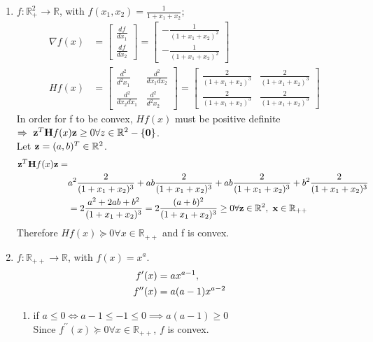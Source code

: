 \documentclass[12pt]{article}
\begin{document}
\begin{enumerate}
\begin{enumerate}
\item 
$f:\mathbb{R}_+^2 \rightarrow \mathbb{R}$, with $f(x_1,x_2) = \frac{1}{1+x_1+x_2}$;
\begin{equation}
	\begin{split}
		\nabla f(x) &=\begin{bmatrix}
			\frac{df}{dx_1} \\ \frac{df}{dx_2}
		\end{bmatrix} =
		\begin{bmatrix}
			-\frac{1}{(1+x_1+x_2)^2} \\ -\frac{1}{(1+x_1+x_2)^2} 
		\end{bmatrix}\\
		Hf(x) &=\begin{bmatrix}
			\frac{d^2}{d^2 x_1} & \frac{d^2}{dx_1dx_2}\\
			\frac{d^2}{dx_2dx_1} & \frac{d^2}{d^2 x_2}
		\end{bmatrix}=\begin{bmatrix}
			\frac{2}{(1+x_1+x_2)^3} & \frac{2}{(1+x_1+x_2)^3}\\
			\frac{2}{(1+x_1+x_2)^3} & \frac{2}{(1+x_1+x_2)^3}
		\end{bmatrix}
	\end{split}
\end{equation}
In order for f to be convex, $Hf(x)$ must be positive definite $\Rightarrow\ {\bf z}^T{\bf H}f(x){\bf z}\ge 0\forall z\in\mathbb{R}^2-\{{\bf 0}\}$.\\
Let ${\bf z}=(a,b)^T \in \mathbb{R}^2$.\\
\begin{equation}
	\begin{split}
		{\bf z}^T{\bf H}f(x){\bf z}= &\\ &a^2\frac{2}{(1+x_1+x_2)^3}+ab\frac{2}{(1+x_1+x_2)^3}+ab\frac{2}{(1+x_1+x_2)^3}+b^2\frac{2}{(1+x_1+x_2)^3} \\
		&=2\frac{a^2+2ab+b^2}{(1+x_1+x_2)^3} = 2\frac{(a+b)^2}{(1+x_1+x_2)^3} \ge0 \forall {\bf z}\in\mathbb{R}^2,\ {\bf x}\in\mathbb{R}_{++}
	\end{split}
\end{equation}
Therefore $Hf(x)\succcurlyeq0 \forall x\in \mathbb{R}_{++}$ and f is  convex. 
\item 
$f:\mathbb{R}_{++} \rightarrow \mathbb{R}$, with $f(x)=x^a$.
\begin{equation}
	\begin{split}
		f^{\prime}(x) &=ax^{a-1}, \cr
		f^{\prime\prime}(x) &= a(a-1)x^{a-2} \cr
	\end{split} 
\end{equation}
\begin{enumerate}
\item if $a \leq 0 \iff a-1\leq-1\leq0 \implies a(a-1)\ge0$\\
 Since $f^{\prime\prime}(x)\succcurlyeq0 \forall x\in\mathbb{R}_{++}$, $f$ is convex.
 

\end{enumerate}
\end{enumerate}
\end{enumerate}
\end{document}
